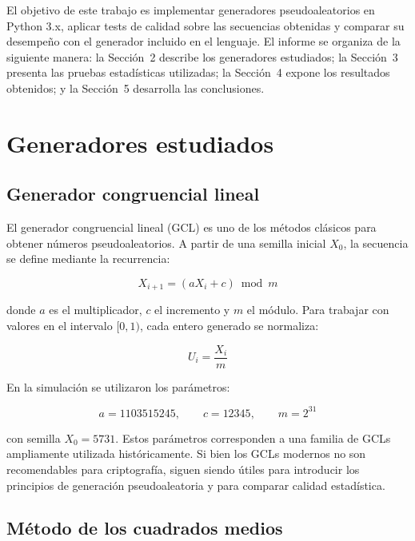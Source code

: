 \documentclass{article}
\begin{document}
El objetivo de este trabajo es implementar generadores pseudoaleatorios en
Python 3.x, aplicar tests de calidad sobre las secuencias obtenidas y comparar
su desempeño con el generador incluido en el lenguaje. El informe se organiza de
la siguiente manera: la Sección~2 describe los generadores estudiados; la
Sección~3 presenta las pruebas estadísticas utilizadas; la Sección~4 expone los
resultados obtenidos; y la Sección~5 desarrolla las conclusiones.

\section{Generadores estudiados}

\subsection{Generador congruencial lineal}

El generador congruencial lineal (GCL) es uno de los métodos clásicos para
obtener números pseudoaleatorios. A partir de una semilla inicial $X_0$, la
secuencia se define mediante la recurrencia:

\begin{equation}
    X_{i+1} = (aX_i + c) \bmod m
\end{equation}

\noindent donde $a$ es el multiplicador, $c$ el incremento y $m$ el módulo. Para
trabajar con valores en el intervalo $[0,1)$, cada entero generado se normaliza:

\begin{equation}
    U_i = \frac{X_i}{m}
\end{equation}

En la simulación se utilizaron los parámetros:

\begin{equation}
    a = 1103515245, \qquad c = 12345, \qquad m = 2^{31}
\end{equation}

\noindent con semilla $X_0 = 5731$. Estos parámetros corresponden a una familia
de GCLs ampliamente utilizada históricamente. Si bien los GCLs modernos no son
recomendables para criptografía, siguen siendo útiles para introducir los
principios de generación pseudoaleatoria y para comparar calidad estadística.

\subsection{Método de los cuadrados medios}
\end{document}
